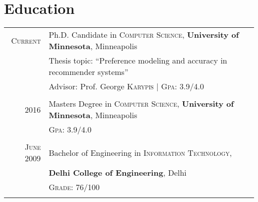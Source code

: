 \documentclass[a4paper,10pt]{article}
\begin{document}
\section{Education}
\begin{tabular}{r|l}	
 \textsc{Current}  & Ph.D. Candidate in \textsc{Computer Science},
  \textbf{University of Minnesota}, Minneapolis\\
 & Thesis topic: ``Preference modeling and accuracy in
  recommender systems''\\
  & \small Advisor: Prof. George
  \textsc{Karypis} | \normalsize \textsc{Gpa}: 3.9/4.0  \\\multicolumn{2}{c}{}\\

  \textsc{2016} & Masters Degree in \textsc{Computer Science},
  \textbf{University of Minnesota}, Minneapolis \\
                     &\normalsize \textsc{Gpa}: 3.9/4.0 \\
                   \multicolumn{2}{c}{}\\ %

   
   \textsc{June} 2009& Bachelor of Engineering in \textsc{Information
      Technology}, \\
      &\textbf{Delhi College of Engineering}, Delhi\\
&\textsc{Grade}: 76/100\\ %
\multicolumn{2}{c}{}\\
\end{tabular}
\end{document}

